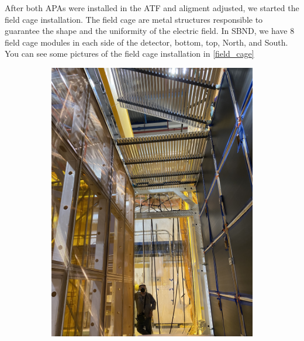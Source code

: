 After both APAs were installed in the ATF and aligment adjusted, we started the field cage installation. The field cage are metal structures responsible to guarantee the shape and the uniformity of the electric field. In SBND, we have 8 field cage modules in each side of the detector, bottom, top, North, and South. You can see some pictures of the field cage installation in \ref{field_cage}

\begin{figure}[ht!]
    \centering
    \begin{subfigure}[t]{0.48\textwidth}
        \includegraphics[width=\textwidth]{Figures/field_cage_1.jpeg}
        \caption{}
    \end{subfigure}
    \hfill
    \begin{subfigure}[t]{0.48\textwidth}

\end{subfigure}
\end{figure}
